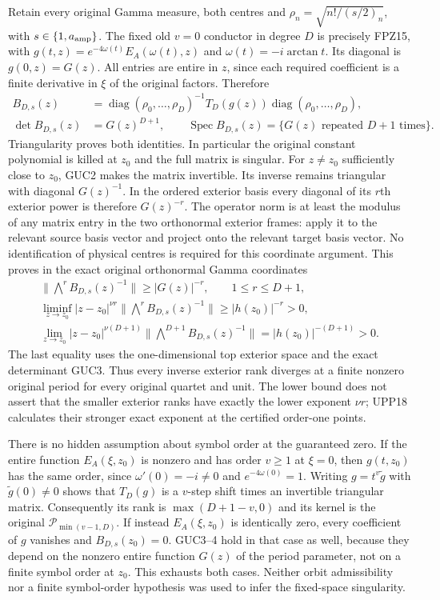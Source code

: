 \documentclass[11pt]{article}
\begin{document}
Retain every original Gamma measure, both centres and
$\rho_n=\sqrt{n!/(s/2)_n}$, with $s\in\{1,a_{\rm amp}\}$.
The fixed old $v=0$ conductor in degree $D$ is precisely FPZ15,
with $g(t,z)=e^{-4\omega(t)}E_A(\omega(t),z)$ and
$\omega(t)=-i\arctan t$. Its diagonal is $g(0,z)=G(z)$.
All entries are entire in $z$, since each required coefficient
is a finite derivative in $\xi$ of the original factors. Therefore
\[
 \begin{split}
 B_{D,s}(z)&=\operatorname{diag}(\rho_0,\ldots,\rho_D)^{-1}
              T_D(g(z))\operatorname{diag}(\rho_0,\ldots,\rho_D),\\
 \det B_{D,s}(z)&=G(z)^{D+1},\qquad
 \operatorname{Spec}B_{D,s}(z)=\{G(z)\text{ repeated }D+1\text{ times}\}.
 \end{split}\tag{GUC3}
\]
Triangularity proves both identities. In particular the original
constant polynomial is killed at $z_0$ and the full matrix is singular.
For $z\ne z_0$ sufficiently close to $z_0$, GUC2 makes the matrix
invertible. Its inverse remains triangular with diagonal $G(z)^{-1}$.
In the ordered exterior basis every diagonal of its $r$th exterior
power is therefore $G(z)^{-r}$. The operator norm is at least the
modulus of any matrix entry in the two orthonormal exterior frames:
apply it to the relevant source basis vector and project onto the
relevant target basis vector. No identification of physical centres
is required for this coordinate argument.
This proves in the exact original orthonormal Gamma coordinates
\[
 \begin{gathered}
 \|\bigwedge^r B_{D,s}(z)^{-1}\|\ge |G(z)|^{-r},
               \qquad 1\le r\le D+1,\\
 \liminf_{z\to z_0}|z-z_0|^{\nu r}
       \|\bigwedge^r B_{D,s}(z)^{-1}\|
            \ge |h(z_0)|^{-r}>0,\\
 \lim_{z\to z_0}|z-z_0|^{\nu(D+1)}
       \|\bigwedge^{D+1}B_{D,s}(z)^{-1}\|
            =|h(z_0)|^{-(D+1)}>0.
 \end{gathered}\tag{GUC4}
\]
The last equality uses the one-dimensional top exterior space and
the exact determinant GUC3. Thus every inverse exterior rank diverges
at a finite nonzero original period for every original quartet and unit.
The lower bound does not assert that the smaller exterior ranks have
exactly the lower exponent $\nu r$; UPP18 calculates their stronger
exact exponent at the certified order-one points.

There is no hidden assumption about symbol order at the guaranteed
zero. If the entire function $E_A(\xi,z_0)$ is nonzero and has order
$v\ge1$ at $\xi=0$, then $g(t,z_0)$ has the same order, since
$\omega'(0)=-i\ne0$ and $e^{-4\omega(0)}=1$.
Writing $g=t^v\widetilde g$ with $\widetilde g(0)\ne0$ shows that
$T_D(g)$ is a $v$-step shift times an invertible triangular matrix.
Consequently its rank is $\max(D+1-v,0)$ and its kernel is the
original $\mathcal P_{\min(v-1,D)}$.
If instead $E_A(\xi,z_0)$ is identically zero, every coefficient
of $g$ vanishes and $B_{D,s}(z_0)=0$. GUC3--4 hold in that case
as well, because they depend on the nonzero entire function $G(z)$
of the period parameter, not on a finite symbol order at $z_0$.
This exhausts both cases. Neither orbit admissibility nor a finite
symbol-order hypothesis was used to infer the fixed-space singularity.
\end{document}
